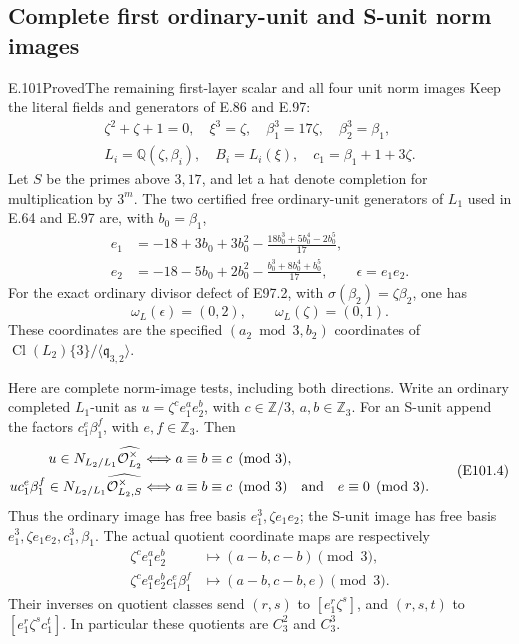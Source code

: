 \subsection{Complete first ordinary-unit and S-unit norm images}

\begin{statement}{E.101}{Proved}{The remaining first-layer scalar and all four unit norm images}
Keep the literal fields and generators of E.86 and E.97:
\[
 \begin{gathered}
 \zeta^2+\zeta+1=0,\quad \xi^3=\zeta,\quad
 \beta_1^3=17\zeta,\quad\beta_2^3=\beta_1,\\
 L_i=\mathbb Q(\zeta,\beta_i),\quad B_i=L_i(\xi),
 \quad c_1=\beta_1+1+3\zeta.
 \end{gathered}
 \tag{E101.1}
\]
Let \(S\) be the primes above \(3,17\), and let a hat
denote completion for multiplication by \(3^m\).
The two certified free ordinary-unit generators of \(L_1\)
used in E.64 and E.97 are, with \(b_0=\beta_1\),
\[
 \begin{aligned}
 e_1&=-18+3b_0+3b_0^2-\frac{18b_0^3+5b_0^4-2b_0^5}{17},\\
 e_2&=-18-5b_0+2b_0^2-\frac{b_0^3+8b_0^4+b_0^5}{17},
 \qquad \epsilon=e_1e_2.
 \end{aligned}
 \tag{E101.2}
\]
For the exact ordinary divisor defect of E97.2, with
\(\sigma(\beta_2)=\zeta\beta_2\), one has
\[
       \omega_L(\epsilon)=(0,2),\qquad
       \omega_L(\zeta)=(0,1).
 \tag{E101.3}
\]
These coordinates are the specified
\((a_2\bmod3,b_2)\) coordinates of
\(\operatorname{Cl}(L_2)\{3\}/\langle\mathfrak q_{3,2}\rangle\).

Here are complete norm-image tests, including both directions.
Write an ordinary completed \(L_1\)-unit as
\(u=\zeta^c e_1^a e_2^b\), with
\(c\in\mathbb Z/3\), \(a,b\in\mathbb Z_3\).
For an S-unit append the factors \(c_1^e\beta_1^f\),
with \(e,f\in\mathbb Z_3\). Then
\[
 \begin{aligned}
 u\in N_{L_2/L_1}\widehat{\mathcal O_{L_2}^{\times}}
       &\Longleftrightarrow a\equiv b\equiv c\pmod3,\\
 uc_1^e\beta_1^f\in
       N_{L_2/L_1}\widehat{\mathcal O_{L_2,S}^{\times}}
       &\Longleftrightarrow
         a\equiv b\equiv c\pmod3\quad\hbox{and}\quad e\equiv0\pmod3.
 \end{aligned}
 \tag{E101.4}
\]
Thus the ordinary image has free basis
\(e_1^3,\zeta e_1e_2\); the S-unit image has free basis
\(e_1^3,\zeta e_1e_2,c_1^3,\beta_1\).
The actual quotient coordinate maps are respectively
\[
 \begin{aligned}
 \zeta^c e_1^a e_2^b&\longmapsto(a-b,c-b)\pmod3,\\
 \zeta^c e_1^a e_2^b c_1^e\beta_1^f
       &\longmapsto(a-b,c-b,e)\pmod3.
 \end{aligned}
 \tag{E101.5}
\]
Their inverses on quotient classes send
\((r,s)\) to \([e_1^r\zeta^s]\), and
\((r,s,t)\) to \([e_1^r\zeta^s c_1^t]\).
In particular these quotients are \(C_3^2\) and \(C_3^3\).


\end{statement}
